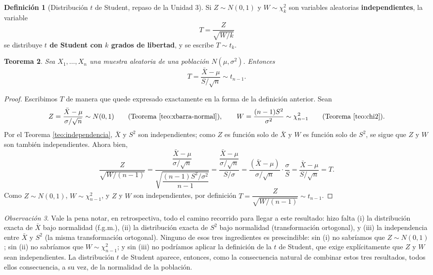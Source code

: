 \documentclass[11pt,a4paper]{article}
\theoremstyle{plain}
\newtheorem{teorema}{Teorema}[section]
\theoremstyle{definition}
\newtheorem{definicion}[teorema]{Definición}
\theoremstyle{remark}
\newtheorem{observacion}[teorema]{Observación}
\begin{document}
\begin{definicion}[Distribución $t$ de Student, repaso de la Unidad 3]
Si $Z\sim N(0,1)$ y $W\sim\chi^2_k$ son variables aleatorias \textbf{independientes}, la variable
$$T = \frac{Z}{\sqrt{W/k}}$$
se distribuye \textbf{$t$ de Student con $k$ grados de libertad}, y se escribe $T\sim t_k$.
\end{definicion}

\begin{teorema}
\label{teo:t-student}
Sea $X_1,\dots,X_n$ una muestra aleatoria de una población $N(\mu,\sigma^2)$. Entonces
$$T = \frac{\bar X-\mu}{S/\sqrt n} \sim t_{n-1}.$$
\end{teorema}

\begin{proof}
Escribimos $T$ de manera que quede expresado exactamente en la forma de la definición anterior. Sean
$$Z = \frac{\bar X-\mu}{\sigma/\sqrt n} \sim N(0,1) \qquad \text{(Teorema \ref{teo:xbarra-normal})}, \qquad W = \frac{(n-1)S^2}{\sigma^2} \sim \chi^2_{n-1} \qquad \text{(Teorema \ref{teo:chi2})}.$$
Por el Teorema \ref{teo:independencia}, $\bar X$ y $S^2$ son independientes; como $Z$ es función solo de $\bar X$ y $W$ es función solo de $S^2$, se sigue que $Z$ y $W$ son también independientes. Ahora bien,
$$\frac{Z}{\sqrt{W/(n-1)}} = \frac{\dfrac{\bar X-\mu}{\sigma/\sqrt n}}{\sqrt{\dfrac{(n-1)S^2/\sigma^2}{n-1}}} = \frac{\dfrac{\bar X-\mu}{\sigma/\sqrt n}}{S/\sigma} = \frac{(\bar X-\mu)}{\sigma/\sqrt n}\cdot \frac{\sigma}{S} = \frac{\bar X-\mu}{S/\sqrt n} = T.$$
Como $Z\sim N(0,1)$, $W\sim\chi^2_{n-1}$, y $Z$ y $W$ son independientes, por definición $T = \dfrac{Z}{\sqrt{W/(n-1)}} \sim t_{n-1}$. \qedhere
\end{proof}

\begin{observacion}
Vale la pena notar, en retrospectiva, todo el camino recorrido para llegar a este resultado: hizo falta (i) la distribución exacta de $\bar X$ bajo normalidad (f.g.m.), (ii) la distribución exacta de $S^2$ bajo normalidad (transformación ortogonal), y (iii) la independencia entre $\bar X$ y $S^2$ (la misma transformación ortogonal). Ninguno de esos tres ingredientes es prescindible: sin (i) no sabríamos que $Z\sim N(0,1)$; sin (ii) no sabríamos que $W\sim\chi^2_{n-1}$; y sin (iii) no podríamos aplicar la definición de la $t$ de Student, que exige explícitamente que $Z$ y $W$ sean independientes. La distribución $t$ de Student aparece, entonces, como la consecuencia natural de combinar estos tres resultados, todos ellos consecuencia, a su vez, de la normalidad de la población.
\end{observacion}
\end{document}
